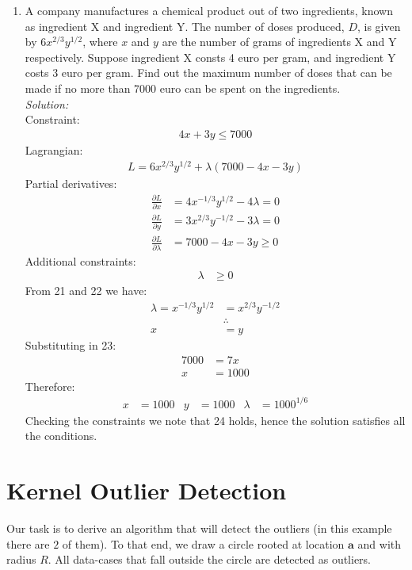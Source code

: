 \documentclass[12pt,a4paper]{article}
\begin{document}
\begin{enumerate}
\item A company manufactures a chemical product out of two ingredients, known as ingredient X and ingredient Y. The number of doses produced, $D$, is given by $6x^{2/3}y^{1/2}$, where $x$ and $y$ are the number of grams of ingredients X and Y respectively. Suppose ingredient X consts {4} euro per gram, and ingredient Y costs 3 euro per gram. Find out the maximum number of doses that can be made if no more than 7000 euro can be spent on the ingredients.\\
	\emph{Solution:} \\
		Constraint:
			\begin{align*}
				4x + 3y \leqslant 7000
			\end{align*}
		Lagrangian:
			\begin{align*}
			L = 6x^{2/3}y^{1/2} + \lambda (7000 -4x -3y)
			\end{align*}
		Partial derivatives:
			\begin{align}
			\frac{\partial L}{\partial x} &= 4x^{-1/3}y^{1/2} - 4\lambda = 0 \\
			\frac{\partial L}{\partial y} &= 3x^{2/3}y^{-1/2} - 3\lambda = 0 \\
			\frac{\partial L}{\partial \lambda} &= 7000 -4x -3y \geqslant 0
			\end{align}
		Additional constraints:
			\begin{align}
			\lambda &\geqslant 0
			\end{align}
		From 21 and 22 we have: 
			\begin{align*}
			\lambda = x^{-1/3}y^{1/2} &= x^{2/3}y^{-1/2} \\
			&\therefore \\
			x &= y
			\end{align*}
		Substituting in 23:
			\begin{align*}
			7000 &= 7x \\
			x &= 1000
			\end{align*}
		Therefore:
			\begin{align*}
			x &= 1000 &
			y &= 1000 &
			\lambda &=  1000^{1/6}
			\end{align*}
		Checking the constraints we note that 24 holds, hence the solution satisfies all the conditions.
\end{enumerate}

\setcounter{equation}{0}
\section{Kernel Outlier Detection}
Our task is to derive an algorithm that will detect the outliers (in this example there are $2$ of them). To that end, we draw a circle rooted at location $\boldsymbol{a}$ and with radius $R$. All data-cases that fall outside the circle are detected as outliers.
\end{document}
